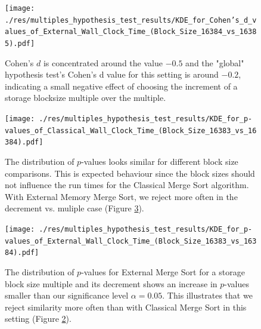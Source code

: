 \documentclass[twocolumn]{article}
\begin{document}
\begin{figure}[htb]
    \begin{minipage}{0.475 \textwidth}
        \centering
        \texttt{[image: ./res/multiples\_hypothesis\_test\_results/KDE\_for\_Cohen's\_d\_values\_of\_External\_Wall\_Clock\_Time\_(Block\_Size\_16384\_vs\_16385).pdf]}
        \caption{Cohen's \(d\) is concentrated around the value \( -0.5 \) and the "global" hypothesis test's Cohen's d value for this setting is around \( -0.2 \),
            indicating a small negative effect of choosing the increment of a storage blocksize multiple over the multiple.}
        \label{fig:KDE_for_Cohen's_d_values_of_External_Wall_Clock_Time_(Block_Size_16384_vs_16385).pdf}
    \end{minipage}
\end{figure}

\begin{figure}[htb]
    \begin{minipage}{0.475 \textwidth}
        \centering
        \texttt{[image: ./res/multiples\_hypothesis\_test\_results/KDE\_for\_p-values\_of\_Classical\_Wall\_Clock\_Time\_(Block\_Size\_16383\_vs\_16384).pdf]}
        \caption{The distribution of \( p \)-values looks similar for different block size comparisons. This is expected behaviour since the block sizes should not influence the run times for the Classical Merge
            Sort algorithm. With External Memory Merge Sort, we reject more often in the decrement vs. muliple case (Figure \ref{fig:KDE_for_p-values_of_External_Wall_Clock_Time_(Block_Size_16383_vs_16384).pdf}).}
        \label{fig:KDE_for_p-values_of_Classical_Wall_Clock_Time_(Block_Size_16383_vs_16384).pdf}
    \end{minipage}
\end{figure}

\begin{figure}[htb]
    \begin{minipage}{0.475 \textwidth}
        \centering
        \texttt{[image: ./res/multiples\_hypothesis\_test\_results/KDE\_for\_p-values\_of\_External\_Wall\_Clock\_Time\_(Block\_Size\_16383\_vs\_16384).pdf]}
        \caption{The distribution of \( p \)-values for External Merge Sort for a storage block size multiple and its decrement shows an increase in \( p \)-values smaller than
            our significance level \( \alpha = 0.05 \). This illustrates that we reject similarity more often than with Classical Merge Sort in this setting
            (Figure \ref{fig:KDE_for_p-values_of_Classical_Wall_Clock_Time_(Block_Size_16383_vs_16384).pdf}).}
        \label{fig:KDE_for_p-values_of_External_Wall_Clock_Time_(Block_Size_16383_vs_16384).pdf}
    \end{minipage}
\end{figure}
\end{document}
